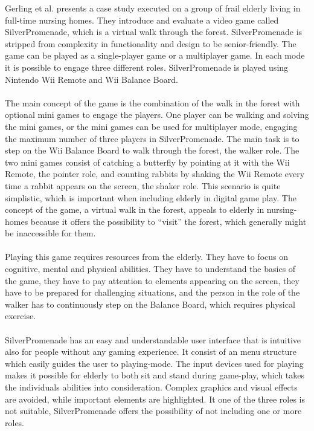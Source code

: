 Gerling et al. \cite{gerling2} presents a case study executed on a group of frail elderly living in full-time nursing homes. They introduce and evaluate a video game called SilverPromenade, which is a virtual walk through the forest. SilverPromenade is stripped from complexity in functionality and design to be senior-friendly. The game can be played as a single-player game or a multiplayer game. In each mode it is possible to engage three different roles. SilverPromenade is played using Nintendo Wii Remote and Wii Balance Board. \\ \\
The main concept of the game is the combination of the walk in the forest with optional mini games to engage the players. One player can be walking and solving the mini games, or the mini games can be used for multiplayer mode, engaging the maximum number of three players in SilverPromenade. The main task is to step on the Wii Balance Board to walk through the forest, the walker role. The two mini games consist of catching a butterfly by pointing at it with the Wii Remote, the pointer role, and counting rabbits by shaking the Wii Remote every time a rabbit appears on the screen, the shaker role. This scenario is quite simplistic, which is important when including elderly in digital game play. The concept of the game, a virtual walk in the forest, appeals to elderly in nursing-homes because it offers the possibility to “visit” the forest, which generally might be inaccessible for them. \\ \\
Playing this game requires resources from the elderly. They have to focus on cognitive, mental and physical abilities. They have to understand the basics of the game, they have to pay attention to elements appearing on the screen, they have to be prepared for challenging situations, and the person in the role of the walker has to continuously step on the Balance Board, which requires physical exercise. \\ \\
SilverPromenade has an easy and understandable user interface that is intuitive also for people without any gaming experience. It consist of an menu structure which easily guides the user to playing-mode. The input devices used for playing makes it possible for elderly to both sit and stand during game-play, which takes the individuals abilities into consideration. Complex graphics and visual effects are avoided, while important elements are highlighted. It one of the three roles is not suitable, SilverPromenade offers the possibility of not including one or more roles. \\ \\
